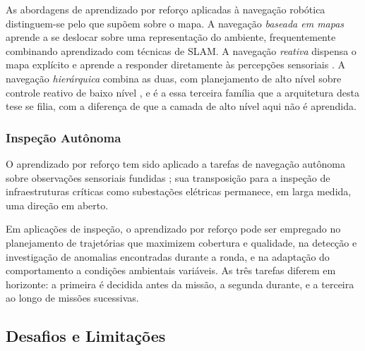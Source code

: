 As abordagens de aprendizado por reforço aplicadas à navegação robótica distinguem-se
pelo que supõem sobre o mapa. A navegação \emph{baseada em mapas} aprende a se deslocar
sobre uma representação do ambiente, frequentemente combinando aprendizado com técnicas
de SLAM. A navegação \emph{reativa} dispensa o mapa explícito e aprende a responder
diretamente às percepções sensoriais \cite{Zhu2017,Tai2017}.
A navegação \emph{hierárquica} combina as duas, com planejamento de alto nível sobre
controle reativo de baixo nível \cite{Kulkarni2016}, e é a essa terceira família que a
arquitetura desta tese se filia, com a diferença de que a camada de alto nível aqui não
é aprendida.

\subsubsection{Inspeção Autônoma}

O aprendizado por reforço tem sido aplicado a tarefas de navegação autônoma sobre observações sensoriais fundidas \cite{Ou2024SensorFusionDRL}; sua transposição para a inspeção de infraestruturas críticas como subestações elétricas permanece, em larga medida, uma direção em aberto.

Em aplicações de inspeção, o aprendizado por reforço pode ser empregado no planejamento
de trajetórias que maximizem cobertura e qualidade, na detecção e investigação de
anomalias encontradas durante a ronda, e na adaptação do comportamento a condições
ambientais variáveis. As três tarefas diferem em horizonte: a primeira é decidida antes
da missão, a segunda durante, e a terceira ao longo de missões sucessivas.

\subsection{Desafios e Limitações}

